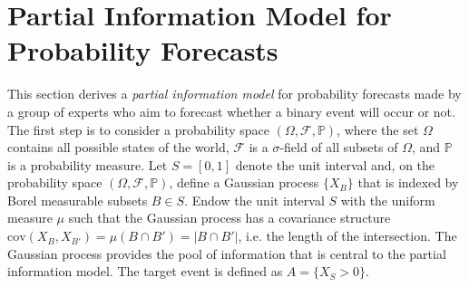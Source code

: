 \documentclass[11pt]{article}
\renewcommand{\P}{\mathbb{P}}
\theoremstyle{definition}
\theoremstyle{definition}
\begin{document}



\section{Partial Information Model for Probability Forecasts}
\label{Model}
 This section derives a \textit{partial information model} for probability forecasts made by a group of experts who aim to forecast whether a binary event will occur or not. The first step is to consider a probability space  $(\Omega, \mathcal{F}, \P)$, where the set $\Omega$ contains all possible states of the world,  $\mathcal{F}$ is a $\sigma$-field of all subsets of $\Omega$, and $\P$ is a probability measure. Let $S = [0,1]$ denote the unit interval and, on the probability space $(\Omega, \mathcal{F}, \P)$, define a Gaussian process $\{ X_B \}$ that is indexed by Borel measurable subsets $B \in S$. Endow the unit interval $S$ with the uniform measure $\mu$ such that the Gaussian process has a covariance structure $\text{cov}(X_B, X_{B'}) = \mu(B \cap B') = |B \cap B'|$, i.e. the length of the intersection.  The Gaussian process provides the pool of information that is central to the partial information model. The target event is defined as $A = \{ X_{S} > 0\}$. 
  
 
\end{document}
